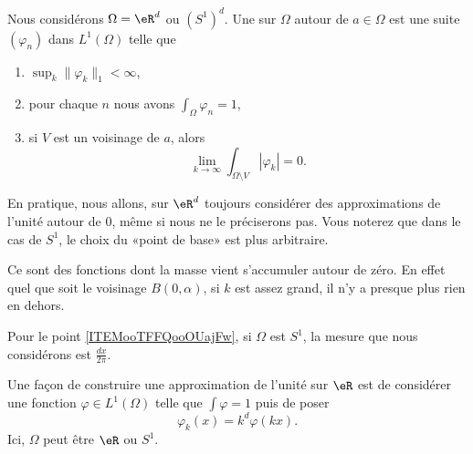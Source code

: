 \begin{definition}
Nous considérons \( \Omega=\eR^d\) ou \( (S^1)^d\). Une  sur \( \Omega\) autour de \( a\in \Omega\) est une suite \( (\varphi_n)\) dans \( L^1(\Omega)\) telle que
    \begin{enumerate}
        \item
            $\sup_k \| \varphi_k \|_1 <\infty$,
        \item   \label{ITEMooGVRQooHDbrcf}
            pour chaque \( n\) nous avons $\int_{\Omega}\varphi_n=1$,
        \item
            si \( V\) est un voisinage de \( a\), alors
            \begin{equation}
                \lim_{k\to \infty} \int_{\Omega\setminus V}| \varphi_k |=0.
            \end{equation}
    \end{enumerate}
    En pratique, nous allons, sur \( \eR^d\) toujours considérer des approximations de l'unité autour de \( 0\), même si nous ne le préciserons pas. Vous noterez que dans le cas de \( S^1\), le choix du «point de base» est plus arbitraire.
\end{definition}
Ce sont des fonctions dont la masse vient s'accumuler autour de zéro. En effet quel que soit le voisinage \( B(0,\alpha)\), si \( k\) est assez grand, il n'y a presque plus rien en dehors.

Pour le point \eqref{ITEMooTFFQooOUajFw}, si \( \Omega\) est \( S^1\), la mesure que nous considérons est \( \frac{ dx }{ 2\pi }\).


\begin{example}
    Une façon de construire une approximation de l'unité sur \( \eR\) est de considérer une fonction \( \varphi\in L^1(\Omega)\) telle que \( \int\varphi=1\) puis de poser
    \begin{equation}
        \varphi_k(x)=k^d\varphi(kx).
    \end{equation}
    Ici, \( \Omega\) peut être \( \eR\) ou \( S^1\).
\end{example}

